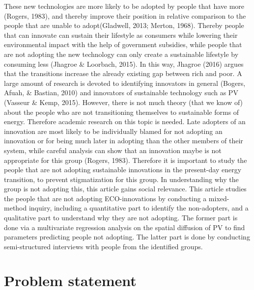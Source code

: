 \documentclass[man,floatsintext]{apa6}
\begin{document}
These new technologies are more likely to be adopted by people that have
more (Rogers, 1983), and thereby improve their position in relative
comparison to the people that are unable to adopt(Gladwell, 2013;
Merton, 1968). Thereby people that can innovate can sustain their
lifestyle as consumers while lowering their environmental impact with
the help of government subsidies, while people that are not adopting the
new technology can only create a sustainable lifestyle by consuming less
(Jhagroe \& Loorbach, 2015). In this way, Jhagroe (2016) argues that the
transitions increase the already existing gap between rich and poor. A
large amount of research is devoted to identifying innovators in general
(Bogers, Afuah, \& Bastian, 2010) and innovators of sustainable
technology such as PV (Vasseur \& Kemp, 2015). However, there is not
much theory (that we know of) about the people who are not transitioning
themselves to sustainable forms of energy. Therefore academic research
on this topic is needed. Late adopters of an innovation are most likely
to be individually blamed for not adopting an innovation or for being
much later in adopting than the other members of their system, while
careful analysis can show that an innovation maybe is not appropriate
for this group (Rogers, 1983). Therefore it is important to study the
people that are not adopting sustainable innovations in the present-day
energy transition, to prevent stigmatization for this group. In
understanding why the group is not adopting this, this article gains
social relevance. This article studies the people that are not adopting
ECO-innovations by conducting a mixed-method inquiry, including a
quantitative part to identify the non-adopters, and a qualitative part
to understand why they are not adopting. The former part is done via a
multivariate regression analysis on the spatial diffusion of PV to find
parameters predicting people not adopting. The latter part is done by
conducting semi-structured interviews with people from the identified
groups.

\section{Problem statement}\label{problem-statement}
\end{document}
